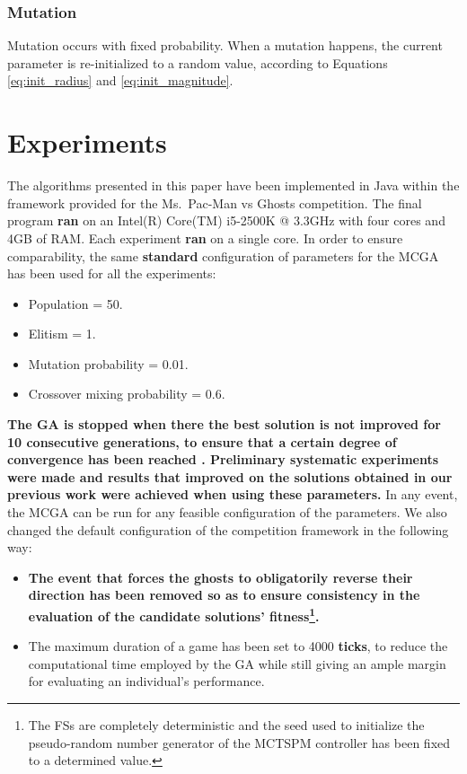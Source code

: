 \documentclass[journal]{IEEEtran}
\begin{document}
\subsubsection{Mutation}
Mutation occurs with fixed probability. When a mutation happens, the current parameter is re-initialized to a random value, according to Equations \eqref{eq:init_radius} and \eqref{eq:init_magnitude}.

\section{Experiments}
\label{sec:Experiments}
The algorithms presented in this paper have been implemented in Java within the framework provided for the Ms.\  Pac-Man vs Ghosts competition. The final program \textbf{ran} on an Intel(R) Core(TM) i5-2500K @ 3.3GHz with four cores and 4GB of RAM. Each experiment \textbf{ran} on a single core. In order to ensure comparability, the same \textbf{standard} configuration of parameters for the MCGA has been used for all the experiments:

\begin{itemize}
  \item Population = 50.
  \item Elitism = 1.
  \item Mutation probability = 0.01.
  \item Crossover mixing probability = 0.6.
\end{itemize}

\textbf{The GA is stopped when there the best solution is not improved for 10 consecutive generations, to ensure that a certain degree of convergence has been reached \cite{Karma2003, Safe2004}. Preliminary systematic experiments were made and results that improved on the solutions obtained in our previous work \cite{Liberatore2014} were achieved when using these parameters.} In any event, the MCGA can be run for any feasible configuration of the parameters.  We also changed the default configuration of the competition framework in the following way:

\begin{itemize}
  \item \textbf{The event that forces the ghosts to obligatorily reverse their direction has been removed so as to ensure consistency in the evaluation of the candidate solutions' fitness\footnote{The FSs are completely deterministic and the seed used to initialize the pseudo-random number generator of the MCTSPM controller has been fixed to a determined value.}.}
  \item The maximum duration of a game has been set to 4000 \textbf{ticks}, to reduce the computational time employed by the GA while still giving an ample margin for evaluating an individual's performance.
\end{itemize}
\end{document}
